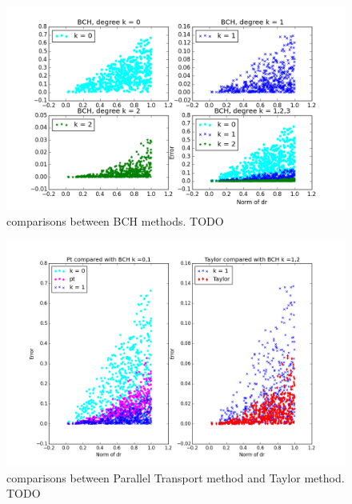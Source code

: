 \begin{figure}[!ht]
	\hspace{-1cm}
	\includegraphics[scale=0.65]{figures/se2_four_BCH.png}
	\caption{comparisons between BCH methods. TODO}
	\label{fig:se2_four_BCH}
\end{figure}

\begin{figure}[!ht]
	\hspace{-2cm}
	\includegraphics[scale=0.6]{figures/se2_pt_taylor.png}
	\caption{comparisons between Parallel Transport method and Taylor method. TODO}
	\label{fig:se2_pt_taylor}
\end{figure}


